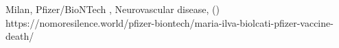           {Milan, }
          {}
          {Pfizer/BioNTech}
          {, }
          {
            Neurovascular disease,
             ()
          }
          {https://nomoresilence.world/pfizer-biontech/maria-ilva-biolcati-pfizer-vaccine-death/}


